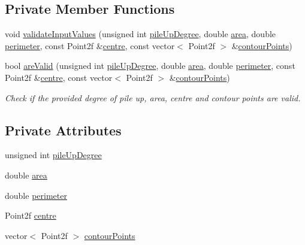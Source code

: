 \subsection*{\-Private \-Member \-Functions}
\begin{DoxyCompactItemize}
\item 
void \hyperlink{classmultiscale_1_1analysis_1_1Entity_afd09bf78874eb411c0940713948c4891}{validate\-Input\-Values} (unsigned int \hyperlink{classmultiscale_1_1analysis_1_1Entity_aae78866cef9fcb7bd2e858570f47d082}{pile\-Up\-Degree}, double \hyperlink{classmultiscale_1_1analysis_1_1Entity_a7fad3c67bb46cc0f4ce1fb17ef3e66cc}{area}, double \hyperlink{classmultiscale_1_1analysis_1_1Entity_ac7bcdb1cb5eb4369ca8e44d3dbda44a3}{perimeter}, const \-Point2f \&\hyperlink{classmultiscale_1_1analysis_1_1Entity_ad226609174b21f71210161d29a16d4ef}{centre}, const vector$<$ \-Point2f $>$ \&\hyperlink{classmultiscale_1_1analysis_1_1Entity_a0199b0a0e5b22809015ecbc23d17785e}{contour\-Points})
\item 
bool \hyperlink{classmultiscale_1_1analysis_1_1Entity_a8b38c81f4b86df13ab640f8d3bac5cbc}{are\-Valid} (unsigned int \hyperlink{classmultiscale_1_1analysis_1_1Entity_aae78866cef9fcb7bd2e858570f47d082}{pile\-Up\-Degree}, double \hyperlink{classmultiscale_1_1analysis_1_1Entity_a7fad3c67bb46cc0f4ce1fb17ef3e66cc}{area}, double \hyperlink{classmultiscale_1_1analysis_1_1Entity_ac7bcdb1cb5eb4369ca8e44d3dbda44a3}{perimeter}, const \-Point2f \&\hyperlink{classmultiscale_1_1analysis_1_1Entity_ad226609174b21f71210161d29a16d4ef}{centre}, const vector$<$ \-Point2f $>$ \&\hyperlink{classmultiscale_1_1analysis_1_1Entity_a0199b0a0e5b22809015ecbc23d17785e}{contour\-Points})
\begin{DoxyCompactList}\small\item\em \-Check if the provided degree of pile up, area, centre and contour points are valid. \end{DoxyCompactList}\end{DoxyCompactItemize}
\subsection*{\-Private \-Attributes}
\begin{DoxyCompactItemize}
\item 
unsigned int \hyperlink{classmultiscale_1_1analysis_1_1Entity_aae78866cef9fcb7bd2e858570f47d082}{pile\-Up\-Degree}
\item 
double \hyperlink{classmultiscale_1_1analysis_1_1Entity_a7fad3c67bb46cc0f4ce1fb17ef3e66cc}{area}
\item 
double \hyperlink{classmultiscale_1_1analysis_1_1Entity_ac7bcdb1cb5eb4369ca8e44d3dbda44a3}{perimeter}
\item 
\-Point2f \hyperlink{classmultiscale_1_1analysis_1_1Entity_ad226609174b21f71210161d29a16d4ef}{centre}
\item 
vector$<$ \-Point2f $>$ \hyperlink{classmultiscale_1_1analysis_1_1Entity_a0199b0a0e5b22809015ecbc23d17785e}{contour\-Points}
\end{DoxyCompactItemize}
